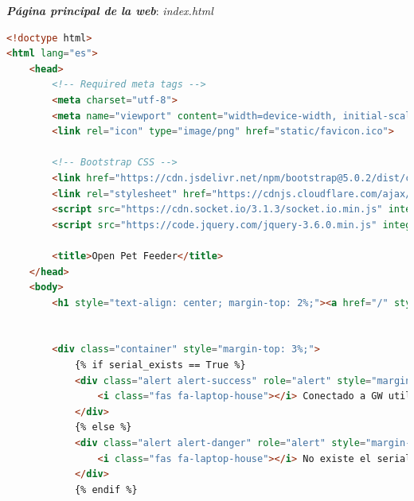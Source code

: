 \documentclass[12pt]{article}
\begin{document}
\noindent \textit{\textbf{Página principal de la web}}: \textit{index.html}\\

\begin{lstlisting}[language=html]
<!doctype html>
<html lang="es">
	<head>
		<!-- Required meta tags -->
		<meta charset="utf-8">
		<meta name="viewport" content="width=device-width, initial-scale=1">
		<link rel="icon" type="image/png" href="static/favicon.ico">
	
		<!-- Bootstrap CSS -->
		<link href="https://cdn.jsdelivr.net/npm/bootstrap@5.0.2/dist/css/bootstrap.min.css" rel="stylesheet" integrity="sha384-EVSTQN3/azprG1Anm3QDgpJLIm9Nao0Yz1ztcQTwFspd3yD65VohhpuuCOmLASjC" crossorigin="anonymous">
		<link rel="stylesheet" href="https://cdnjs.cloudflare.com/ajax/libs/font-awesome/5.15.3/css/all.min.css" integrity="sha512-iBBXm8fW90+nuLcSKlbmrPcLa0OT92xO1BIsZ+ywDWZCvqsWgccV3gFoRBv0z+8dLJgyAHIhR35VZc2oM/gI1w==" crossorigin="anonymous" referrerpolicy="no-referrer" />
		<script src="https://cdn.socket.io/3.1.3/socket.io.min.js" integrity="sha384-cPwlPLvBTa3sKAgddT6krw0cJat7egBga3DJepJyrLl4Q9/5WLra3rrnMcyTyOnh" crossorigin="anonymous"></script>
		<script src="https://code.jquery.com/jquery-3.6.0.min.js" integrity="sha256-/xUj+3OJU5yExlq6GSYGSHk7tPXikynS7ogEvDej/m4=" crossorigin="anonymous"></script>
	
		<title>Open Pet Feeder</title>
	</head>
	<body>
		<h1 style="text-align: center; margin-top: 2%;"><a href="/" style="text-decoration: none; color: inherit;"><i class="fas fa-paw"></i> Open Pet Feeder</a></h1>
	
	
		<div class="container" style="margin-top: 3%;">
			{% if serial_exists == True %}
			<div class="alert alert-success" role="alert" style="margin-bottom: 3%;">
				<i class="fas fa-laptop-house"></i> Conectado a GW utilizando el serial: {{serial_port}}!
			</div>
			{% else %}
			<div class="alert alert-danger" role="alert" style="margin-bottom: 3%;">
				<i class="fas fa-laptop-house"></i> No existe el serial '{{serial_port}}'. Configura el serial y reinicia el programa.
			</div>
			{% endif %}
				

\end{lstlisting}
\end{document}
